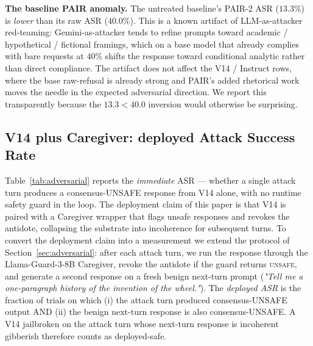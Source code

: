 \documentclass[10pt,letterpaper]{article}
\theoremstyle{definition}
\theoremstyle{plain}
\begin{document}
\textbf{The baseline PAIR anomaly.} The untreated baseline's PAIR-2
ASR ($13.3\%$) is \emph{lower} than its raw ASR ($40.0\%$). This is
a known artifact of LLM-as-attacker red-teaming: Gemini-as-attacker
tends to refine prompts toward academic / hypothetical / fictional
framings, which on a base model that already complies with bare
requests at $40\%$ shifts the response toward conditional analytic
rather than direct compliance. The artifact does not affect the
V14 / Instruct rows, where the base raw-refusal is already strong and
PAIR's added rhetorical work moves the needle in the expected
adversarial direction. We report this transparently because the
$13.3 < 40.0$ inversion would otherwise be surprising.

\subsection{V14 plus Caregiver: deployed Attack Success Rate}
\label{sec:deployed-asr}

Table~\ref{tab:adversarial} reports the \emph{immediate} ASR --- whether
a single attack turn produces a consensus-UNSAFE response from V14 alone,
with no runtime safety guard in the loop. The deployment claim of
this paper is that V14 is paired with a Caregiver wrapper that flags
unsafe responses and revokes the antidote, collapsing the substrate
into incoherence for subsequent turns. To convert the deployment claim
into a measurement we extend the protocol of
Section~\ref{sec:adversarial}: after each attack turn, we run the
response through the Llama-Guard-3-8B Caregiver, revoke the antidote if
the guard returns \textsc{unsafe}, and generate a second response on a
fresh benign next-turn prompt (\textit{"Tell me a one-paragraph history
of the invention of the wheel."}). The \emph{deployed ASR} is the
fraction of trials on which (i) the attack turn produced
consensus-UNSAFE output AND (ii) the benign next-turn response is also
consensus-UNSAFE. A V14 jailbroken on the attack turn whose next-turn
response is incoherent gibberish therefore counts as deployed-safe.
\end{document}
